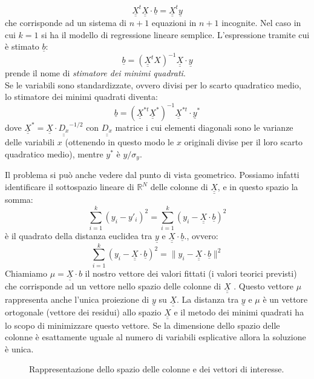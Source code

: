 \documentclass[]{article}
\def\doubleunderline#1{\underline{\underline{#1}}}
\begin{document}
\begin{equation}
\doubleunderline{X}^t \doubleunderline{X} \cdot \underline{b} = \doubleunderline{X}^t \underline{y}
\end{equation}
che corrisponde ad un sistema di $n+1$ equazioni in $n+1$ incognite. Nel caso in cui $k = 1$ si ha il modello di regressione lineare semplice. L'espressione tramite cui è stimato $\underline{b}$:
\begin{equation}
\underline{b} = (\doubleunderline{X}^t X)^{-1} \doubleunderline{X} \cdot \underline{y}
\end{equation}
prende il nome di \textit{stimatore dei minimi quadrati}.\\
Se le variabili sono standardizzate, ovvero divisi per lo scarto quadratico medio, lo stimatore dei minimi quadrati diventa:
\begin{equation}
\underline{b} = (\doubleunderline{X}^{*t} \doubleunderline{X}^*)^{-1} \doubleunderline{X}^{*t} \cdot \underline{y}^*
\end{equation}
dove $\doubleunderline{X}^* = \doubleunderline{X} \cdot \doubleunderline{D_x}^{-1/2}$ con $\doubleunderline{D_x}$ matrice i cui elementi diagonali sono le varianze delle variabili $x$ (ottenendo in questo modo le $x$ originali divise per il loro scarto quadratico medio), mentre $y^*$ è $y/\sigma_y$.

Il problema si può anche vedere dal punto di vista geometrico. Possiamo infatti identificare il sottospazio lineare di $\mathbb{R}^N$ delle colonne di $\doubleunderline{X}$, e in questo spazio la somma:
\begin{equation}
\sum_{i=1}^k (y_i - y'_i)^2 = \sum_{i=1}^k (y_i - \doubleunderline{X} \cdot \underline{b})^2
\end{equation}
è il quadrato della distanza euclidea tra $\underline{y}$ e $\doubleunderline{X} \cdot \underline{b}$., ovvero:
\begin{equation}
\sum_{i=1}^k (y_i - \doubleunderline{X} \cdot \underline{b})^2 = \| y_i - \doubleunderline{X} \cdot \underline{b} \|^2
\end{equation}
Chiamiamo $\mu = \doubleunderline{X} \cdot b$ il nostro vettore dei valori fittati (i valori teorici previsti) che corrisponde ad un vettore nello spazio delle colonne di $\doubleunderline{X}$ . Questo vettore $\mu$ rappresenta anche l'unica proiezione di $\underline{y}$ su $\doubleunderline{X}$. La distanza tra $\underline{y}$ e $\mu$ è un vettore ortogonale (vettore dei residui) allo spazio $\doubleunderline{X}$ e il metodo dei minimi quadrati ha lo scopo di minimizzare questo vettore. Se la dimensione dello spazio delle colonne è esattamente uguale al numero di variabili esplicative allora la soluzione è unica.
\begin{figure}
\caption{Rappresentazione dello spazio delle colonne e dei vettori di interesse.}
\end{figure}
\end{document}
